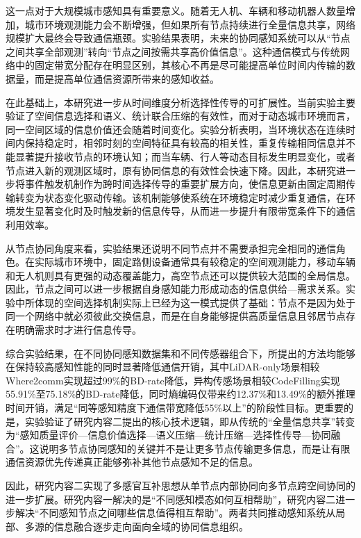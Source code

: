 这一点对于大规模城市感知具有重要意义。随着无人机、车辆和移动机器人数量增加，城市环境观测能力会不断增强，但如果所有节点持续进行全量信息共享，网络规模扩大最终会导致通信瓶颈。实验结果表明，未来的协同感知系统可以从“节点之间共享全部观测”转向“节点之间按需共享高价值信息”。这种通信模式与传统网络中的固定带宽分配存在明显区别，其核心不再是尽可能提高单位时间内传输的数据量，而是提高单位通信资源所带来的感知收益。

在此基础上，本研究进一步从时间维度分析选择性传导的可扩展性。当前实验主要验证了空间信息选择和语义、统计联合压缩的有效性，而对于动态城市环境而言，同一空间区域的信息价值还会随着时间变化。实验分析表明，当环境状态在连续时间内保持稳定时，相邻时刻的空间特征具有较高的相关性，重复传输相同信息并不能显著提升接收节点的环境认知；而当车辆、行人等动态目标发生明显变化，或者节点进入新的观测区域时，原有协同信息的有效性会快速下降。因此，本研究进一步将事件触发机制作为跨时间选择传导的重要扩展方向，使信息更新由固定周期传输转变为状态变化驱动传输。该机制能够使系统在环境稳定时减少重复通信，在环境发生显著变化时及时触发新的信息传导，从而进一步提升有限带宽条件下的通信利用效率。

从节点协同角度来看，实验结果还说明不同节点并不需要承担完全相同的通信角色。在实际城市环境中，固定路侧设备通常具有较稳定的空间观测能力，移动车辆和无人机则具有更强的动态覆盖能力，高空节点还可以提供较大范围的全局信息。因此，节点之间可以进一步根据自身感知能力形成动态的信息供给—需求关系。实验中所体现的空间选择机制实际上已经为这一模式提供了基础：节点不是因为处于同一个网络中就必须彼此交换信息，而是在自身能够提供高质量信息且邻居节点存在明确需求时才进行信息传导。

综合实验结果，在不同协同感知数据集和不同传感器组合下，所提出的方法均能够在保持较高感知性能的同时显著降低通信开销，其中LiDAR-only场景相较Where2comm实现超过99\%的BD-rate降低，异构传感场景相较CodeFilling实现55.91\%至75.18\%的BD-rate降低，同时熵编码仅带来约12.37\%和13.49\%的额外推理时间开销，满足“同等感知精度下通信带宽降低55\%以上”的阶段性目标。更重要的是，实验验证了研究内容二提出的核心技术逻辑，即从传统的“全量信息共享”转变为“感知质量评价—信息价值选择—语义压缩—统计压缩—选择性传导—协同融合”。这说明多节点协同感知的关键并不是让更多节点传输更多信息，而是让有限通信资源优先传递真正能够弥补其他节点感知不足的信息。

因此，研究内容二实现了多感官互补思想从单节点内部协同向多节点跨空间协同的进一步扩展。研究内容一解决的是“不同感知模态如何互相帮助”，研究内容二进一步解决“不同感知节点之间哪些信息值得相互帮助”。两者共同推动感知系统从局部、多源的信息融合逐步走向面向全域的协同信息组织。


